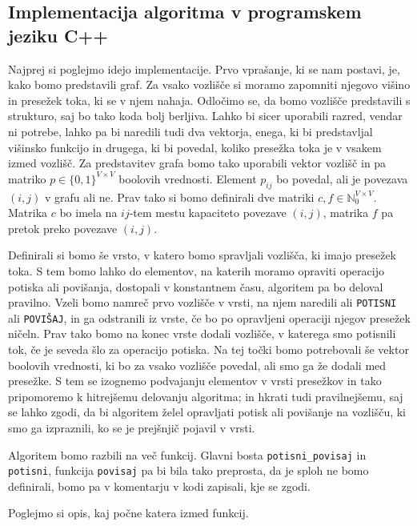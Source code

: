 \documentclass[mat1]{fmfdelo}
\newcommand{\N}{\mathbb N}
\begin{document}
\subsection{Implementacija algoritma v programskem jeziku C++}

Najprej si poglejmo idejo implementacije. Prvo vprašanje, ki se nam postavi, je, kako bomo predstavili graf. Za vsako vozlišče si moramo zapomniti njegovo višino in presežek toka, ki se v njem nahaja. Odločimo se, da bomo vozlišče predstavili s strukturo, saj bo tako koda bolj berljiva. Lahko bi sicer uporabili razred, vendar ni potrebe, lahko pa bi naredili tudi dva vektorja, enega, ki bi predstavljal višinsko funkcijo in drugega, ki bi povedal, koliko presežka toka je v vsakem izmed vozlišč. Za predstavitev grafa bomo tako uporabili vektor vozlišč in pa matriko $p\in \{0,1\}^{V \times V}$ boolovih vrednosti. Element $p_{ij}$ bo povedal, ali je povezava $(i,j)$ v grafu ali ne. Prav tako si bomo definirali dve matriki $c, f \in \N_0^{V \times V}$. Matrika $c$ bo imela na $ij$-tem mestu kapaciteto povezave $(i,j)$, matrika $f$ pa pretok preko povezave $(i,j)$.

Definirali si bomo še vrsto, v katero bomo spravljali vozlišča, ki imajo presežek toka. S tem bomo lahko do elementov, na katerih moramo opraviti operacijo potiska ali povišanja, dostopali v konstantnem času, algoritem pa bo deloval pravilno. Vzeli bomo namreč prvo vozlišče v vrsti, na njem naredili ali \texttt{POTISNI} ali \texttt{POVIŠAJ}, in ga odstranili iz vrste, če bo po opravljeni operaciji njegov presežek ničeln. Prav tako bomo na konec vrste dodali vozlišče, v katerega smo potisnili tok, če je seveda šlo za operacijo potiska. Na tej točki bomo potrebovali še vektor boolovih vrednosti, ki bo za vsako vozlišče povedal, ali smo ga že dodali med presežke. S tem se izognemo podvajanju elementov v vrsti presežkov in tako pripomoremo k hitrejšemu delovanju algoritma; in hkrati tudi pravilnejšemu, saj se lahko zgodi, da bi algoritem želel opravljati potisk ali povišanje na vozlišču, ki smo ga izpraznili, ko se je prejšnjič pojavil v vrsti.

Algoritem bomo razbili na več funkcij. Glavni bosta \texttt{potisni\_povisaj} in \texttt{potisni}, funkcija \texttt{povisaj} pa bi bila tako preprosta, da je sploh ne bomo definirali, bomo pa v komentarju v kodi zapisali, kje se zgodi.

Poglejmo si opis, kaj počne katera izmed funkcij.
\end{document}
